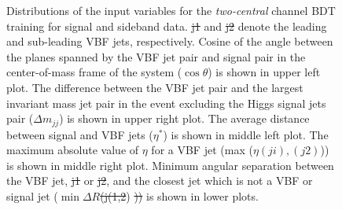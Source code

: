 \documentclass[PAPER, american,coverpage,texlive=2016, english]{\ATLASLATEXPATH atlasdoc}
\providecommand{\DIFadd}[1]{{\protect\color{blue}\uwave{#1}}} %
\providecommand{\DIFdel}[1]{{\protect\color{red}\sout{#1}}}                      %
\providecommand{\DIFaddFL}[1]{\DIFadd{#1}} %
\providecommand{\DIFdelFL}[1]{\DIFdel{#1}} %
\providecommand{\DIFaddbeginFL}{} %
\providecommand{\DIFaddendFL}{} %
\providecommand{\DIFdelbeginFL}{} %
\providecommand{\DIFdelendFL}{} %
\begin{document}
\begin{figure}[htbp]
  \caption{Distributions of the input variables for the \textit{two-central} channel BDT training for signal and sideband data. \DIFdelbeginFL \DIFdelFL{j1 }\DIFdelendFL \DIFaddbeginFL \DIFaddFL{$j1$ }\DIFaddendFL and \DIFdelbeginFL \DIFdelFL{j2 }\DIFdelendFL \DIFaddbeginFL \DIFaddFL{$j2$ }\DIFaddendFL denote the leading \pT{} and sub-leading \pT{} VBF jets, respectively.  Cosine of the angle between the planes spanned by the VBF jet pair and signal pair in the center-of-mass frame of the  system ($\cos{\theta}$) is shown in upper left plot.  The difference between the VBF jet pair and the largest invariant mass jet pair in the event excluding the Higgs signal jets pair ($\Delta m_{jj}$) is shown in upper right plot.  The average distance between signal and VBF jets ($\eta^{*}$) is shown in middle left plot.  The maximum absolute value of $\eta$ for a VBF jet (max ($\eta(ji),(j2)$)) is shown in middle right plot.   Minimum angular separation between the VBF jet, \DIFdelbeginFL \DIFdelFL{j1 }\DIFdelendFL \DIFaddbeginFL \DIFaddFL{$j1$ }\DIFaddendFL or \DIFdelbeginFL \DIFdelFL{j2}\DIFdelendFL \DIFaddbeginFL \DIFaddFL{$j2$}\DIFaddendFL ,  and the closest jet which is not a VBF or signal jet (\DIFdelbeginFL \DIFdelFL{$\min\Delta R$(j(1,2}\DIFdelendFL \DIFaddbeginFL \DIFaddFL{$\min\Delta R(j1,j2)$}\DIFaddendFL ) \DIFdelbeginFL \DIFdelFL{)) }\DIFdelendFL is shown in lower plots.}
  \label{fig:bdtvar2cen1}
\end{figure}
\end{document}
